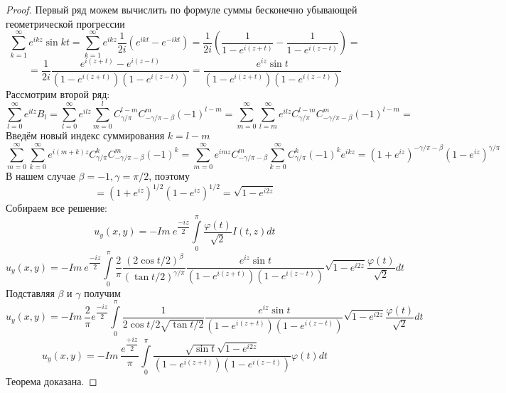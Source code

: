 \documentclass[a4paper, 9pt]{article}
\begin{document}
\begin{proof}
		Первый ряд можем вычислить по формуле суммы бесконечно убывающей геометрической прогрессии
		\begin{equation*}
			\sum\limits_{k=1}^{\infty} e^{ikz}\sin{kt} =  \sum\limits_{k=1}^{\infty} e^{ikz}\dfrac{1}{2i}\left(e^{ikt} - e^{-ikt}\right) = \dfrac1{2i} \left(\dfrac{1}{1 - e^{i(z+t)}} -  \dfrac{1}{1 - e^{i(z-t)}}\right) = 
		\end{equation*}
		\begin{equation*}
			= \dfrac{1}{2i}  \dfrac{e^{i(z+t)} - e^{i(z-t)}}{\left(1 - e^{i(z+t)} \right) \left(1 - e^{i(z-t)}\right)} =  \dfrac{e^{iz} \sin{t}}{\left(1 - e^{i(z+t)} \right) \left(1 - e^{i(z-t)}\right)}
		\end{equation*}
		Рассмотрим второй ряд:
		\begin{equation*}
			\sum\limits_{l =0 }^{\infty} e^{ilz} B_{l} = \sum\limits_{l =0 }^{\infty} e^{ilz} \sum\limits_{m=0}^{l} C^{l - m}_{\gamma/\pi} C^{m}_{-\gamma/\pi - \beta} (-1)^{l-m} = \sum\limits_{m=0}^{\infty} \sum\limits_{l=m}^{\infty} e^{ilz} C^{l - m}_{\gamma/\pi} C^{m}_{-\gamma/\pi - \beta} (-1)^{l-m} = 
		\end{equation*}
		Введём новый индекс суммирования $k = l -m$
		\begin{equation*}
			\sum\limits_{m=0}^{\infty} \sum\limits_{k=0}^{\infty} e^{i(m+k)z} C^{k}_{\gamma/\pi} C^{m}_{-\gamma/\pi - \beta} (-1)^{k} = \sum\limits_{m=0}^{\infty} e^{imz} C^{m}_{-\gamma/\pi - \beta} \sum\limits_{k=0}^{\infty}  C^{k}_{\gamma/\pi} (-1)^k e^{ikz} = (1 + e^{iz})^{-\gamma/\pi - \beta} (1- e^{iz})^{\gamma/\pi} 
		\end{equation*}
		В нашем случае $\beta = -1, \gamma = \pi/2$, поэтому
		\begin{equation*}
			= (1 + e^{iz})^{1/2} (1- e^{iz})^{1/2} =\sqrt{1 - e^{i2z}} 
		\end{equation*}
		Собираем все решение:
		\begin{equation*}
			u_y(x,y) = - Im\ e^{\dfrac{-iz}{2}} \int\limits_0^\pi \dfrac{\varphi(t)}{\sqrt2} I(t,z) dt 
		\end{equation*}
		\begin{equation*}
			u_y(x,y) = - Im\ e^{\dfrac{-iz}{2}} \int\limits_0^\pi \dfrac{2}{\pi}\dfrac{(2\cos{t/2})^\beta}{(\tan{t/2})^{\gamma/\pi}}  \dfrac{e^{iz} \sin{t}}{\left(1 - e^{i(z+t)} \right) \left(1 - e^{i(z-t)}\right)} \sqrt{1 - e^{i2z}} \dfrac{\varphi(t)}{\sqrt2} dt
		\end{equation*}
		Подставляя $\beta$ и $\gamma$ получим
		\begin{equation*}
			u_y(x,y) = - Im\  \dfrac{2}{\pi} e^{\dfrac{-iz}{2}} \int\limits_0^\pi \dfrac{1}{2\cos{t/2} \sqrt{\tan{t/2}}}  \dfrac{e^{iz} \sin{t}}{\left(1 - e^{i(z+t)} \right) \left(1 - e^{i(z-t)}\right)} \sqrt{1 - e^{i2z}} \dfrac{\varphi(t)}{\sqrt2} dt
		\end{equation*}
		\begin{equation*}
			u_y(x,y) = - Im\  \dfrac{e^{\dfrac{+iz}{2}}}{\pi}  \int\limits_0^\pi  \dfrac{\sqrt{\sin{t}} \sqrt{1 - e^{i2z}}}{\left(1 - e^{i(z+t)} \right) \left(1 - e^{i(z-t)}\right)}  \varphi(t) dt
		\end{equation*}
		Теорема доказана.
	\end{proof}
\end{document}
